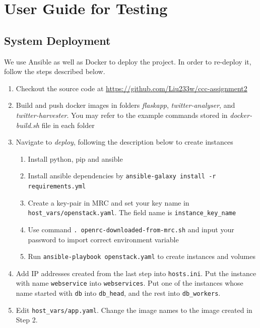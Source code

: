 \documentclass[parskip=full, 11pt]{article}
\begin{document}
\section{User Guide for Testing}

\subsection{System Deployment}

We use Ansible as well as Docker to deploy the project. In order to re-deploy it, follow the steps described below.

\begin{enumerate}
    \item Checkout the source code at \url{https://github.com/Liu233w/ccc-assignment2}
    \item \label{step:create_image} Build and push docker images in folders \emph{flaskapp}, \emph{twitter-analyser}, and \emph{twitter-harvester}. You may refer to the example commands stored in \emph{docker-build.sh} file in each folder
    \item Navigate to \emph{deploy}, following the description below to create instances
    \begin{enumerate}
        \item Install python, pip and ansible
        \item Install ansible dependencies by \texttt{ansible-galaxy install -r requirements.yml}
        \item Create a key-pair in MRC and set your key name in \texttt{host\_vars/openstack.yaml}. The field name is \texttt{instance\_key\_name}
        \item Use command \texttt{. openrc-downloaded-from-mrc.sh} and input your password to import correct environment variable
        \item Run \texttt{ansible-playbook openstack.yaml} to create instances and volumes
    \end{enumerate}
    
    \item Add IP addresses created from the last step into \texttt{hosts.ini}. Put the instance with name \texttt{webservice} into \texttt{webservices}. Put one of the instances whose name started with \texttt{db} into \texttt{db\_head}, and the rest into \texttt{db\_workers}.
    
    \item Edit \texttt{host\_vars/app.yaml}. Change the image names to the image created in Step 2.
    

\end{enumerate}
\end{document}

